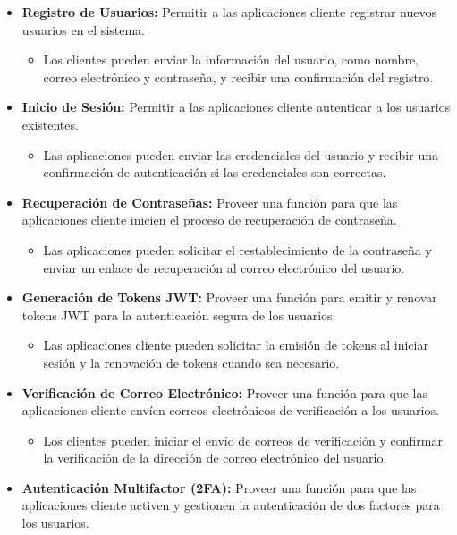 \documentclass{article}
\begin{document}
\begin{itemize}
    \item \textbf{Registro de Usuarios:} Permitir a las aplicaciones cliente registrar nuevos usuarios en el sistema.
          \begin{itemize}
              \item Los clientes pueden enviar la información del usuario, como nombre, correo electrónico y contraseña, y recibir una confirmación del registro.
          \end{itemize}
    \item \textbf{Inicio de Sesión:} Permitir a las aplicaciones cliente autenticar a los usuarios existentes.
          \begin{itemize}
              \item Las aplicaciones pueden enviar las credenciales del usuario y recibir una confirmación de autenticación si las credenciales son correctas.
          \end{itemize}
    \item \textbf{Recuperación de Contraseñas:} Proveer una función para que las aplicaciones cliente inicien el proceso de recuperación de contraseña.
          \begin{itemize}
              \item Las aplicaciones pueden solicitar el restablecimiento de la contraseña y enviar un enlace de recuperación al correo electrónico del usuario.
          \end{itemize}
    \item \textbf{Generación de Tokens JWT:} Proveer una función para emitir y renovar tokens JWT para la autenticación segura de los usuarios.
          \begin{itemize}
              \item Las aplicaciones cliente pueden solicitar la emisión de tokens al iniciar sesión y la renovación de tokens cuando sea necesario.
          \end{itemize}
    \item \textbf{Verificación de Correo Electrónico:} Proveer una función para que las aplicaciones cliente envíen correos electrónicos de verificación a los usuarios.
          \begin{itemize}
              \item Los clientes pueden iniciar el envío de correos de verificación y confirmar la verificación de la dirección de correo electrónico del usuario.
          \end{itemize}
    \item \textbf{Autenticación Multifactor (2FA):} Proveer una función para que las aplicaciones cliente activen y gestionen la autenticación de dos factores para los usuarios.

\end{itemize}
\end{document}
